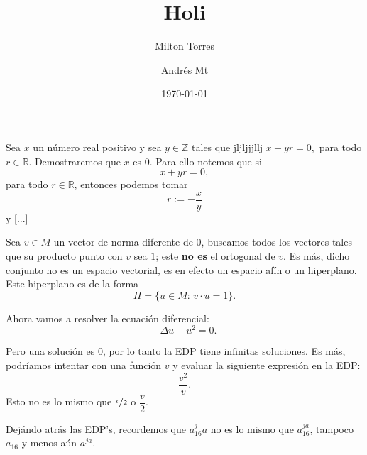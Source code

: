 \documentclass[a5paper, 12pt]{article}
\author{Milton Torres \and Andrés Mt}
\title{Holi}
\date{\today}
\begin{document}
	\maketitle
	
	Sea \(x\) un número real positivo y sea \( y \in \mathbb{Z}\) tales que jljljjjllj
	\(
		x + y r 
		= 0,	
	\)
	para todo \( r \in \mathbb{R}\). Demostraremos que \(x\) es \(0\). Para ello notemos que si 
	\[
		x + yr = 0,
	\]
	para todo \( r \in \mathbb{R}\), entonces podemos tomar 
	\[
		r := -\dfrac{x}{y}	
	\]
	y [...]
	
	\vspace{\baselineskip}
	\begin{multicols}{2}
		Sea \(v\in M\) un vector de norma diferente de \(0\), buscamos todos los vectores tales que su producto punto con \(v\) sea \(1\); este \textbf{no es} el ortogonal de \(v\). Es más, dicho conjunto no es un espacio vectorial, es en efecto un espacio afín o un hiperplano. Este hiperplano es de la forma
		\[
			H = \{u \in M : \, v \cdot u = 1\}		.
		\]
	\end{multicols}
	
	
	Ahora vamos a resolver la ecuación diferencial:
	\[
		-\Delta u + u^2 = 0.	
	\]
	
	Pero una solución es \(0\), por lo tanto la EDP tiene infinitas soluciones. Es más, podríamos intentar con una función \(v\) y evaluar la siguiente expresión en la EDP:
	\[
			\dfrac{v^2}{v}.
	\]
	Esto no es lo mismo que \( \nicefrac{v}{2} \) o \( \dfrac{v}{2} \).
	
	Dejándo atrás las EDP's, recordemos que \( a_16^ja\) no es lo mismo que \( a_{16}^{ja}\), tampoco \( a_{16}\) y menos aún \( a^{ja}\).
	
	
	
	
	
	
	
	
	
	
	
	
	
	
	
	
	
	
	
	
	
	
	
\end{document}
